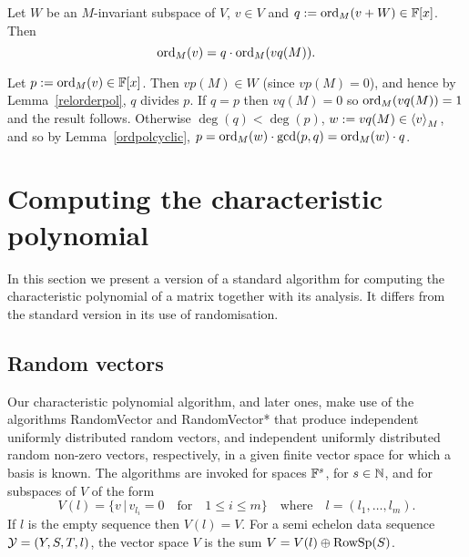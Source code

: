 %

\begin{Lemm}
\label{absordpoly}
Let $W$ be an $M$-invariant subspace of $V$, $v \in V$ and 
$q := \mathrm{ord}_M(v+W) \in \mathbb{F}[x]$. Then
\[ \mathrm{ord}_M(v) = q \cdot \mathrm{ord}_M(vq(M)). \]
\end{Lemm}
\proofbeg
Let $p := \mathrm{ord}_M(v) \in \mathbb{F}[x]$. Then $vp(M) \in W$ (since $vp(M)=0$),
and hence by Lemma~\ref{relorderpol}, $q$ divides $p$. If $q=p$
then $vq(M)=0$ so $\mathrm{ord}_M(vq(M)) =1$ and the result follows.
Otherwise $\deg(q)< \deg(p)$, $w:=vq(M)\in\left< v\right>_M$, and so by
Lemma~\ref{ordpolcyclic}, $p=\mathrm{ord}_M(w)\cdot \gcd(p,q)=\mathrm{ord}_M(w)\cdot q$.
\proofend

\section{Computing the characteristic polynomial}

\label{charpoly}

In this section we present a version of a standard algorithm for computing
the characteristic polynomial of a matrix together with its analysis. 
It differs from the standard version in its use of randomisation. 

\subsection{Random vectors}\label{random}

Our characteristic polynomial algorithm, and later ones, 
make use of the algorithms {\sc Random\-Vector} and 
{\sc RandomVector*} that produce independent uniformly 
dis\-tri\-bu\-ted random vectors, and independent uniformly distributed
random non-zero vectors,             
respectively, in a given finite vector space for which a basis is known.    
The algorithms are invoked for spaces
$\mathbb{F}^s$, for $s \in \mathbb{N}$, and for subspaces of $V$ of the form
\[
V(l)=\{ v\,|\, v_{l_i}=0\quad\mbox{for}\quad  1\leq i\leq m\}
\quad\mbox{where}\quad l=(l_1,\dots,l_m).
\]
If $l$ is the empty sequence then $V(l)=V$.
For a semi echelon data sequence $\mathcal{Y} = (Y,S,T,l)$, the 
vector space $V$ is the sum $V=V(l) \oplus \mathrm{RowSp}(S)$. 

